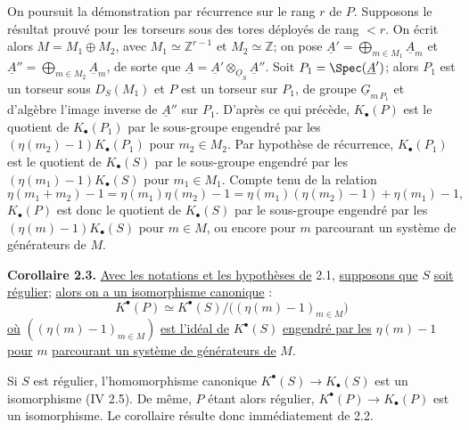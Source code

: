 
On
poursuit la démonstration par récurrence sur le rang $r$ de $P$. Supposons le résultat prouvé pour les torseurs sous des tores déployés de rang $<r$. On écrit alors $M=M_1\oplus M_2$, avec $M_1\simeq\mathbb Z^{r-1}$ et $M_2\simeq\mathbb Z$; on pose $\underline{A}'=\bigoplus_{m\in M_1}\underline{A}_m$ et $\underline{A}''=\bigoplus_{m\in M_2}\underline{A}_m$, de sorte que $\underline{A}=\underline{A}'\otimes_{\underline{O}_S}\underline{A}''$. Soit $P_1=\Spec(\underline{A}')$; alors $P_1$ est un torseur sous $D_S(M_1)$ et $P$ est un torseur sur $P_1$, de groupe $\underline{G}_{m\,P_1}$ et d'algèbre l'image inverse de $\underline{A}''$ sur $P_1$. D'après ce qui précède, $K_\bullet(P)$ est le quotient de $K_\bullet(P_1)$ par le sous-groupe engendré par les $(\eta(m_2)-1)K_\bullet(P_1)$ pour $m_2\in M_2$. Par hypothèse de récurrence, $K_\bullet(P_1)$ est le quotient de $K_\bullet(S)$ par le sous-groupe engendré par les $(\eta(m_1)-1)K_\bullet(S)$ pour $m_1\in M_1$. Compte tenu de la relation
\[
\eta(m_1+m_2)-1=\eta(m_1)\eta(m_2)-1
=\eta(m_1)(\eta(m_2)-1)+\eta(m_1)-1,
\]
$K_\bullet(P)$ est donc le quotient de $K_\bullet(S)$ par le sous-groupe engendré par les $(\eta(m)-1)K_\bullet(S)$ pour $m\in M$, ou encore pour $m$ parcourant un système de générateurs de $M$.

\textbf{Corollaire 2.3.} \uline{Avec les notations et les hypothèses de} 2.1, \uline{supposons que} $S$ \uline{soit régulier}; \uline{alors on a un isomorphisme canonique} :
\[
K^{\bullet}(P)\simeq K^{\bullet}(S)/\bigl((\eta(m)-1)_{m\in M}\bigr)
\]
\uline{où} $((\eta(m)-1)_{m\in M})$ \uline{est l'idéal de} $K^{\bullet}(S)$ \uline{engendré par les} $\eta(m)-1$ \uline{pour} $m$ \uline{parcourant un système de générateurs de} $M$.

Si $S$ est régulier, l'homomorphisme canonique $K^{\bullet}(S)\to K_\bullet(S)$ est un isomorphisme (IV 2.5). De même, $P$ étant alors régulier, $K^{\bullet}(P)\to K_\bullet(P)$ est un isomorphisme. Le corollaire résulte donc immédiatement de 2.2.

